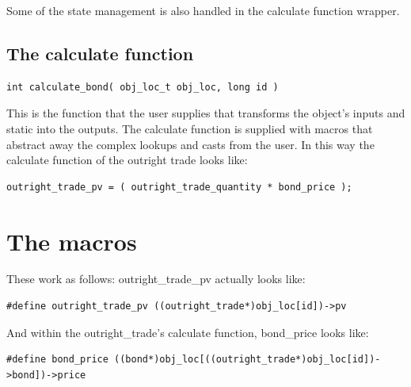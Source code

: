 \documentclass{report}
\begin{document}
Some of the state management is also handled in the calculate function wrapper.

\subsection{The calculate function}

\begin{verbatim}
int calculate_bond( obj_loc_t obj_loc, long id )
\end{verbatim}

This is the function that the user supplies that transforms the object's inputs and static into the outputs.  The calculate function is supplied with macros that abstract away the complex lookups and casts from the user. In this way the calculate function of the outright trade looks like:

\begin{verbatim}
outright_trade_pv = ( outright_trade_quantity * bond_price );
\end{verbatim}


\section{The macros}

These work as follows: outright_trade_pv actually looks like:

\begin{verbatim}
#define outright_trade_pv ((outright_trade*)obj_loc[id])->pv
\end{verbatim}

And within the outright_trade's calculate function, bond_price looks like:

\begin{verbatim}
#define bond_price ((bond*)obj_loc[((outright_trade*)obj_loc[id])->bond])->price
\end{verbatim}
\end{document}
